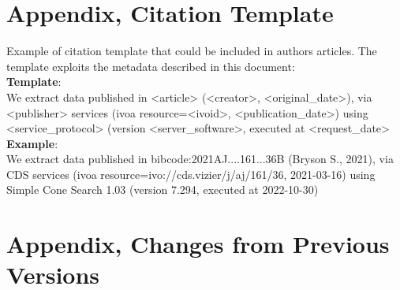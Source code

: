 \documentclass[11pt,a4paper]{ivoa}
\begin{document}



\section{Appendix, Citation Template} \label{sec:appendixC}

Example of citation template that could be included in authors articles. The template exploits the metadata described in this document:\\

\textbf{Template}:\\
We extract data published in <article> (<creator>, <original\_date>),
via <publisher> services (ivoa resource=<ivoid>, <publication\_date>)
using <service\_protocol> (version <server\_software>, executed at <request\_date>\\


\textbf{Example}:\\
We extract data published in bibcode:2021AJ....161...36B (Bryson S., 2021),
via CDS services (ivoa resource=ivo://cds.vizier/j/aj/161/36, 2021-03-16)
using Simple Cone Search 1.03 (version 7.294, executed at 2022-10-30)


\section{Appendix, Changes from Previous Versions}
\end{document}
